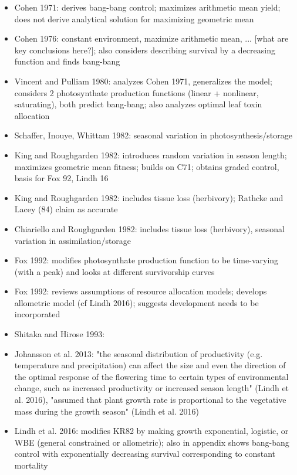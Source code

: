 \documentclass[12pt, oneside]{article}   	%
\begin{document}
\iffalse
\begin{itemize}

\item Cohen 1971: derives bang-bang control; maximizes arithmetic mean yield; does not derive analytical solution for maximizing geometric mean
\item Cohen 1976: constant environment, maximize arithmetic mean, ... [what are key conclusions here?]; also considers describing survival by a decreasing function and finds bang-bang
\item Vincent and Pulliam 1980: analyzes Cohen 1971, generalizes the model; considers 2 photosynthate production functions (linear + nonlinear, saturating), both predict bang-bang; also analyzes optimal leaf toxin allocation
\item Schaffer, Inouye, Whittam 1982: seasonal variation in photosynthesis/storage
\item King and Roughgarden 1982: introduces random variation in season length; maximizes geometric mean fitness; builds on C71; obtains graded control, basis for Fox 92, Lindh 16
\item King and Roughgarden 1982: includes tissue loss (herbivory); Rathcke and Lacey (84) claim as accurate
\item Chiariello and Roughgarden 1982: includes tissue loss (herbivory), seasonal variation in assimilation/storage
\item Fox 1992: modifies photosynthate production function to be time-varying (with a peak) and looks at different survivorship curves
\item Fox 1992: reviews assumptions of resource allocation models; develops allometric model (cf Lindh 2016); suggests development needs to be incorporated
\item Shitaka and Hirose 1993:
\item Johansson et al. 2013: "the seasonal distribution of productivity (e.g. temperature and precipitation) can affect the size and even the direction of the optimal response of the flowering time to certain types of environmental change, such as increased productivity or increased season length" (Lindh et al. 2016), "assumed that plant growth rate is proportional to the vegetative mass during the growth season" (Lindh et al. 2016)
\item Lindh et al. 2016: modifies KR82 by making growth exponential, logistic, or WBE (general constrained or allometric); also in appendix shows bang-bang control with exponentially decreasing survival corresponding to constant mortality

\end{itemize}
\end{document}
